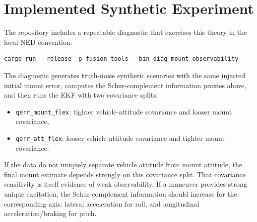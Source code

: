 \documentclass[11pt]{article}
\begin{document}
\section{Implemented Synthetic Experiment}

The repository includes a repeatable diagnostic that exercises this theory in
the local NED convention:
\begin{verbatim}
cargo run --release -p fusion_tools --bin diag_mount_observability
\end{verbatim}
The diagnostic generates truth-noise synthetic scenarios with the same injected
initial mount error, computes the Schur-complement information proxies above,
and then runs the EKF with two covariance splits:
\begin{itemize}[nosep]
  \item \texttt{qerr\_mount\_flex}: tighter vehicle-attitude covariance and
        looser mount covariance,
  \item \texttt{qerr\_att\_flex}: looser vehicle-attitude covariance and
        tighter mount covariance.
\end{itemize}
If the data do not uniquely separate vehicle attitude from mount attitude, the
final mount estimate depends strongly on this covariance split. That covariance
sensitivity is itself evidence of weak observability. If a maneuver provides
strong unique excitation, the Schur-complement information should increase for
the corresponding axis: lateral acceleration for roll, and longitudinal
acceleration/braking for pitch.
\end{document}
